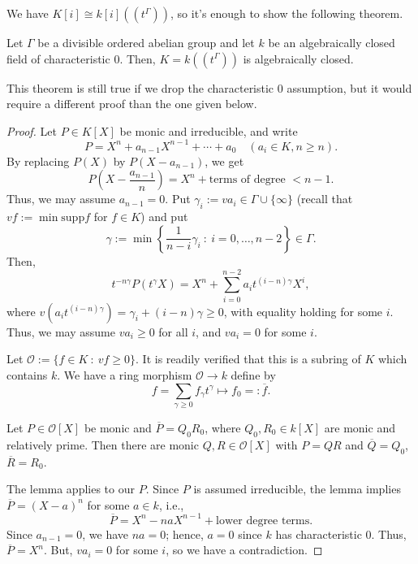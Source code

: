 We have $K[i]\cong k[i]((t^\Gamma))$, so it's enough to show the following theorem.

\begin{theorem} Let $\Gamma$ be a divisible ordered abelian group and let $k$ be an algebraically closed field of characteristic $0$.  Then, $K=k((t^\Gamma))$ is algebraically closed. \end{theorem}

\begin{remark} This theorem is still true if we drop the characteristic $0$ assumption, but it would require a different proof than the one given below. \end{remark}

\begin{proof} Let $P\in K[X]$ be monic and irreducible, and write
$$P=X^n+a_{n-1}X^{n-1}+\cdots +a_0 \quad (a_i\in K, n\geq n).$$
By replacing $P(X)$ by $P(X-a_{n-1})$, we get
$$P\left(X-\frac{a_{n-1}}{n}\right) = X^n + \text{terms of degree $<n-1$}.$$
Thus, we may assume $a_{n-1}=0$.  Put $\gamma_i:=va_i\in \Gamma\cup\{\infty\}$ (recall that $vf:= \min \text{supp} f$ for $f\in K$) and put
$$\gamma:= \min \left \{\frac{1}{n-i}\gamma_i \ : \ i=0, \dots, n-2 \right \} \in \Gamma.$$
Then,
$$t^{-n\gamma}P(t^\gamma X)= X^n + \sum_{i=0}^{n-2}a_it^{(i-n)\gamma}X^i,$$
where $v(a_it^{(i-n)\gamma}) = \gamma_i + (i-n)\gamma\geq 0$, with equality holding for some $i$.  Thus, we may assume $va_i\geq 0$ for all $i$, and $va_i=0$ for some $i$.  

Let $\mathcal{O}:= \{f\in K \ : \ vf\geq 0\}$.  It is readily verified that this is a subring of $K$ which contains $k$.  We have a ring morphism $\mathcal{O}\rightarrow k$ define by
$$f= \sum_{\gamma\geq 0} f_\gamma t^\gamma \mapsto f_0=: \overline{f}.$$

\begin{lemma} Let $P\in \mathcal{O}[X]$ be monic and $\overline{P}=Q_0R_0$, where $Q_0, R_0\in k[X]$ are monic and relatively prime.  Then there are monic $Q, R\in \mathcal{O}[X]$ with $P=QR$ and $\overline{Q}=Q_0$, $\overline{R}=R_0$.  \end{lemma}

The lemma applies to our $P$.  Since $P$ is assumed irreducible, the lemma implies $\overline{P}=(X-a)^n$ for some $a\in k$, i.e., 
$$\overline{P}= X^n-naX^{n-1}+ \text{lower degree terms}.$$
Since $a_{n-1}=0$, we have $na=0$; hence, $a=0$ since $k$ has characteristic $0$.  Thus, $\overline{P}=X^n$.  But, $va_i=0$ for some $i$, so we have a contradiction.  


\end{proof}
